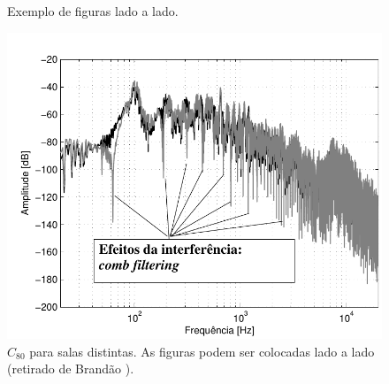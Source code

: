 \documentclass[12pt, a4paper, twoside, twocolumn]{article}
\begin{document}
\begin{figure}[H]
\vspace{-0.4em}
  \centering
	\qquad
  \caption{Exemplo de figuras lado a lado.}
  \label{subfig.exemplo}
\end{figure}

\begin{figure}[ht!]
 \vspace{-2em}
	\centering
        \includegraphics[width=0.98\linewidth,page=1]{figs/Combfilter-Brandao-2017.pdf}
        \vspace{-0.5em}
        \caption{$C_{80}$ para salas distintas. As figuras podem ser colocadas lado a lado (retirado de Brandão \cite{Brandao-2017}).}
	\label{fig:C80}%
\end{figure}
\end{document}
